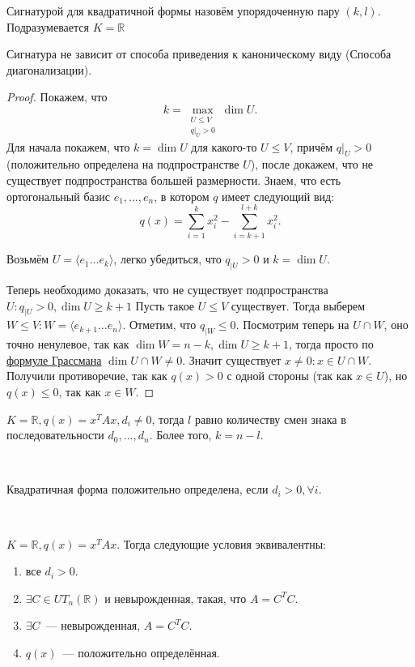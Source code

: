 \begin{definition}
    Сигнатурой для квадратичной формы назовём упорядоченную пару $(k,l)$. Подразумевается $K = \mathbb{R}$
\end{definition}
\begin{theorem}
    Сигнатура не зависит от способа приведения к каноническому виду (Способа диагонализации).
\end{theorem}
\begin{proof}
    Покажем, что 
    \[
        k = \max_{\substack{U\le V \\ q|_U > 0}} \dim U
    .\] 
    Для начала покажем, что $k = \dim U$ для какого-то  $U\le V$, причём $q|_U > 0$
    (положительно определена на подпространстве $U$), после докажем, что не существует
    подпространства большей размерности.
    Знаем, что есть ортогональный базис $e_1,\dots,e_n$, в котором $q$ имеет следующий вид:
     \[
         q(x) = \sum\limits_{i=1}^{k}{x_i^2} - \sum\limits_{i = k + 1}^{l + k}{x^2_i}
    .\] 

    Возьмём $U = \langle e_1\dots e_k\rangle$, легко убедиться, что $q_{|U} > 0$ и $k = \dim U$.

    Теперь необходимо доказать, что не существует подпространства $U\colon
    q_{|U} > 0, \dim U \ge k + 1$
    Пусть такое $U \le V$ существует. Тогда выберем $W \le V \colon W = \langle e_{k + 1} \dots e_n\rangle$.
    Отметим, что $q_{|W} \le 0$.
    Посмотрим теперь на  $U \cap W$, оно точно ненулевое, так как $\dim W = n - k, \dim U \ge k + 1$,
    тогда просто по \hyperref[thm:Формула Грассмана]{формуле Грассмана}
    $\dim U \cap W \not= 0$.
    Значит существует  $x \not= 0\colon x\in U\cap W$. Получили противоречие, так как $q(x) > 0$ с одной стороны
    (так как $x\in U$), но $q(x) \le 0$, так как $x\in W$.
\end{proof}
\begin{follow}
    $K = \mathbb{R}, q(x) = x^T A x, d_i \not= 0$, тогда $l$ равно количеству смен знака в
    последовательности $d_0,\dots,d_n$. Более того, $k = n - l$.
\end{follow}
\\\quad
\begin{follow}
    Квадратичная форма положительно определена, если $d_i > 0, \forall i$.
\end{follow}
\\\quad
\begin{theorem}
     $K = \mathbb{R}, q(x) = x^TAx.$ 
     Тогда следующие условия эквивалентны:
     \begin{enumerate}
         \item все $d_i > 0$.
         \item $\exists C \in UT_n(\mathbb{R})$ и невырожденная, такая, что $A = C^T C$.
         \item  $\exists C$~--- невырожденная, $A = C^T C$.
         \item  $q(x)$~--- положительно определённая.
     \end{enumerate}
\end{theorem}
